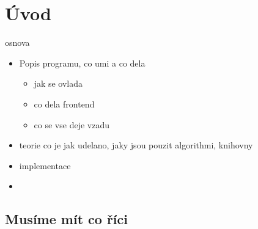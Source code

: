 
\chapter{Úvod}
osnova
\begin{itemize}
\item Popis programu, co umi a co dela
\begin{itemize}
	\item jak se ovlada
	\item co dela frontend
	\item co se vse deje vzadu
\end{itemize}
\item teorie co je jak udelano, jaky jsou pouzit algorithmi, knihovny
\item implementace\cite{oglDev}
	
\item  
\end{itemize}

\section{Musíme mít co říci}




